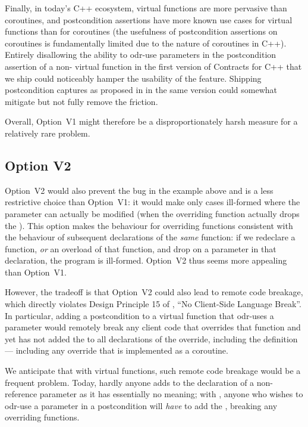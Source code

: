 Finally, in today's C++ ecosystem, virtual functions are more pervasive than coroutines, and postcondition assertions have more known use cases for virtual functions than for coroutines (the usefulness of postcondition assertions on coroutines is fundamentally limited due to the nature of coroutines in C++). Entirely disallowing the ability to odr-use parameters in the postcondition assertion of a non- virtual function in the first version of Contracts for C++ that we ship could noticeably hamper the usability of the feature. Shipping postcondition captures as proposed in \cite{P3098R0} in the same version could somewhat mitigate but not fully remove the friction.

Overall, Option~V1 might therefore be a disproportionately harsh measure for a relatively rare problem.

\subsection*{Option V2}

Option~V2 would also prevent the bug in the example above and is a less restrictive choice than Option~V1: it would make only cases ill-formed where the parameter can actually be modified (when the overriding function actually drops the ). This option makes  the behaviour for overriding functions consistent with the behaviour of subsequent declarations of the \emph{same} function: if we redeclare a function, \emph{or} an overload of that function, and drop  on a parameter in that declaration, the program is ill-formed. Option~V2 thus seems more appealing than Option~V1.

However, the tradeoff is that Option~V2 could also lead to remote code breakage, which directly violates Design Principle 15 of \cite{P2900R10}, ``No Client-Side Language Break''. In particular, adding a postcondition to a virtual function that odr-uses a  parameter would remotely break any client code that overrides that function and yet has not added the  to all declarations of the override, including the definition --- including any override that is implemented as a coroutine.

We anticipate that with virtual functions, such remote code breakage would be a frequent problem. Today, hardly anyone adds  to the declaration of a non-reference parameter as it has essentially no meaning; with \cite{P2900R10}, anyone who wishes to odr-use a parameter in a postcondition will \emph{have} to add the , breaking any overriding functions.

